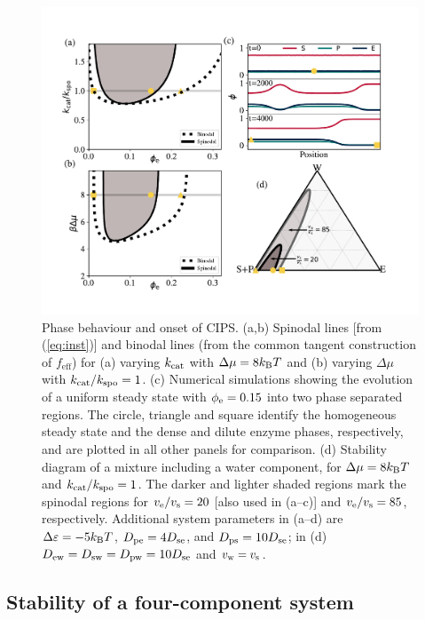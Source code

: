 \begin{figure}
    \centering
    \includegraphics[width=\textwidth]{figures/CIPSphase.pdf}
    \caption{Phase behaviour and onset of CIPS. (a,b) Spinodal lines [from (\ref{eq:inst})] and binodal lines (from the common tangent construction of $f_\mathrm{eff}$) for (a) varying $k_{\mathrm{cat}}$ with $\Delta\mu=8 k_{\rm B} T$ and (b) varying $\Delta \mu$ with $k_{\mathrm{cat}}/k_{\mathrm{spo}}=1$. (c) Numerical simulations showing the evolution of a uniform steady state with $\phi_{\mathrm{e}}=0.15$ into two phase separated regions. The circle, triangle and square identify the homogeneous steady state and the dense and dilute enzyme phases, respectively, and are plotted in all other panels for comparison. (d) Stability diagram of a mixture including a water component, for $\Delta\mu=8 k_{\rm B} T$ and $k_{\mathrm{cat}}/k_{\mathrm{spo}}=1$. The darker and lighter shaded regions mark the spinodal regions for $v_{\mathrm{e}}/v_{\mathrm{s}}=20$ [also used in (a--c)] and $v_{\mathrm{e}}/v_{\mathrm{s}}=85$, respectively. Additional system parameters in (a--d) are $\Delta \varepsilon=-5 k_{\rm B} T$, $D_{\mathrm{pe}}=4 D_{\mathrm{se}}$, and $D_{\mathrm{ps}}=10 D_{\mathrm{se}}$; in (d) $D_{\mathrm{ew}}=D_{\mathrm{sw}}=D_{\mathrm{pw}}=10 D_{\mathrm{se}}$ and $v_{\mathrm{w}}=v_{\mathrm{s}}$.}
    \label{fig:CIPSphase}
\end{figure}

\subsection{Stability of a four-component system}

